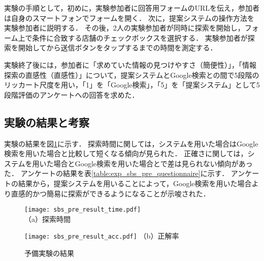     実験の手順として，初めに，実験参加者に回答用フォームのURLを伝え，参加者は自身のスマートフォンでフォームを開く．
    次に，提案システムの操作方法を実験参加者に説明する．
    その後，2人の実験参加者が同時に探索を開始し，フォーム上で条件に合致する店舗のチェックボックスを選択する．
    実験参加者が探索を開始してから送信ボタンをタップするまでの時間を測定する．
    
    実験終了後には，参加者に「求めていた情報の見つけやすさ（簡便性）」，「情報探索の直感性（直感性）」について，提案システムとGoogle検索との間で5段階のリッカート尺度を用い，「1」を「Google検索」，「5」を「提案システム」として5段階評価のアンケートへの回答を求めた．

  \subsection{実験の結果と考察}
    実験の結果を図\ref{figure:exp_sbs_pre_result}に示す．
    探索時間に関しては，システムを用いた場合はGoogle検索を用いた場合と比較して短くなる傾向が見られた．
    正確さに関しては，システムを用いた場合とGoogle検索を用いた場合とで差は見られない傾向があった．
    アンケートの結果を表\ref{table:exp_sbs_pre_questionnaire}に示す．
    アンケートの結果から，提案システムを用いることによって，Google検索を用いた場合より直感的かつ簡易に探索ができるようになることが示唆された．

    \begin{figure}[t]
      \begin{minipage}{0.49\hsize}
        \begin{center}
          \texttt{[image: sbs\_pre\_result\_time.pdf]}\\
          \small{（a）探索時間}
        \end{center}
      \end{minipage}
      \begin{minipage}{0.49\hsize}
        \begin{center}
          \texttt{[image: sbs\_pre\_result\_acc.pdf]}
          \small{（b）正解率}
        \end{center}
      \end{minipage}
      \caption{予備実験の結果}
      \label{figure:exp_sbs_pre_result}
    \end{figure}

